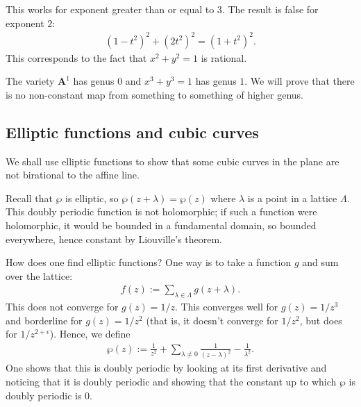 \documentclass [11 pt, oneside, margin = 1 in] {article}
\begin{document}
\begin{remark}
	This works for exponent greater than or equal to $3$. The result is false for exponent $2$:
	\begin{align*}
		(1-t^2)^2 +  (2t^2)^2 =  (1+t^2)^2.
	\end{align*}
	This corresponds to the fact that $x^2+y^2=1$ is rational.
\end{remark}

\begin{remark}
	The variety $\mathbf{A}^1$ has genus $0$ and $x^3+y^3=1$ has genus $1$. We will prove that there is no non-constant map from something to something of higher genus.
\end{remark}

\subsection{Elliptic functions and cubic curves}
We shall use elliptic functions to show that some cubic curves in the plane are not birational to the affine line.

Recall that $\wp$ is elliptic, so $\wp(z+\lambda) = \wp(z)$ where $\lambda$ is a point in a lattice $\Lambda$. This doubly periodic function is not holomorphic; if such a function were holomorphic, it would be bounded in a fundamental domain, so bounded everywhere, hence constant by Liouville's theorem. 

How does one find elliptic functions? One way is to take a function $g$ and sum over the lattice:
\begin{align*}
	f(z) :=  \sum_{\lambda\in \Lambda}^{} g (z+\lambda).
\end{align*}
This does not converge for $g(z) = 1/z$. This converges well for $g(z) = 1/z^3$ and borderline for $g(z)=1/z^2$ (that is, it doesn't converge for $1/z^2$, but does for $1/z^{2+\epsilon}$). Hence, we define
 \begin{align*}
	\wp(z) :=  \frac{1}{z^2} + \sum_{\lambda\ne 0}^{} \frac{1}{(z-\lambda)^2} - \frac{1}{\lambda^2}.
\end{align*}
One shows that this is doubly periodic by looking at its first derivative and noticing that it is doubly periodic and showing that the constant up to which $\wp$ is doubly periodic is $0$.
\end{document}
